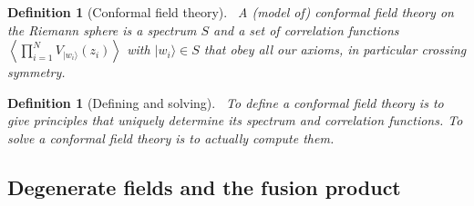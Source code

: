 \documentclass[12pt, a4paper]{article}
\theoremstyle{break}
\newtheorem{defn}[exo]{Definition}
\begin{document}
\begin{defn}[Conformal field theory]
~\label{def:cft}
A (model of) conformal field theory on the Riemann sphere is a spectrum $S$ and a set of correlation functions $\left<\prod_{i=1}^N V_{|w_i\rangle}(z_i)\right>$ with $|w_i\rangle\in S$ that obey all our axioms, in particular crossing symmetry. 
\end{defn}

\begin{defn}[Defining and solving]
 ~\label{def:def}
 To define a conformal field theory is to give principles that uniquely determine its spectrum and correlation functions.
 To solve a conformal field theory is to actually compute them.
\end{defn}

\subsection{Degenerate fields and the fusion product}\label{sec:dffp}
\end{document}

